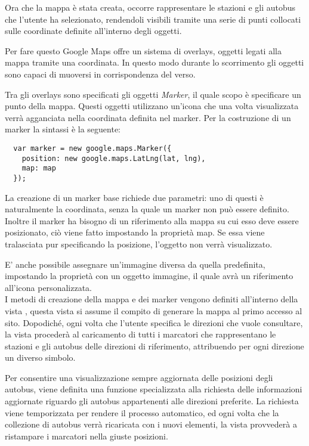 Ora che la mappa è stata creata, occorre rappresentare le stazioni e gli autobus che l'utente ha selezionato, rendendoli visibili tramite una serie di punti collocati sulle coordinate definite all'interno degli oggetti.

Per fare questo Google Maps offre un sistema di overlays, oggetti legati alla mappa tramite una coordinata. In questo modo durante lo scorrimento gli oggetti sono capaci di muoversi in corrispondenza del verso.

Tra gli overlays sono specificati gli oggetti {\itshape Marker}, il quale scopo è specificare un punto della mappa. Questi oggetti utilizzano un'icona che una volta visualizzata verrà agganciata nella coordinata definita nel marker.
\newpage
Per la costruzione di un marker la sintassi è la seguente:

\begin{verbatim}
  var marker = new google.maps.Marker({
    position: new google.maps.LatLng(lat, lng),
    map: map
  });
\end{verbatim}

La creazione di un marker base richiede due parametri: uno di questi è naturalmente la coordinata, senza la quale un marker non può essere definito. Inoltre il marker ha bisogno di un riferimento alla mappa su cui esso deve essere posizionato, ciò viene fatto impostando la proprietà map. Se essa viene tralasciata pur specificando la posizione, l'oggetto non verrà visualizzato.

E' anche possibile assegnare un'immagine diversa da quella predefinita, impostando la proprietà  con un oggetto immagine, il quale avrà un riferimento all'icona personalizzata.\\

I metodi di creazione della mappa e dei marker vengono definiti all'interno della vista , questa vista si assume il compito di generare la mappa al primo accesso al sito. Dopodiché, ogni volta che l'utente specifica le direzioni che vuole consultare, la vista procederà al caricamento di tutti i marcatori che rappresentano le stazioni e gli autobus delle direzioni di riferimento, attribuendo per ogni direzione un diverso simbolo.

Per consentire una visualizzazione sempre aggiornata delle posizioni degli autobus, viene definita una funzione specializzata alla richiesta delle informazioni aggiornate riguardo gli autobus appartenenti alle direzioni preferite. La richiesta viene temporizzata per rendere il processo automatico, ed ogni volta che la collezione di autobus verrà ricaricata con i nuovi elementi, la vista provvederà a ristampare i marcatori nella giuste posizioni.
\newpage


